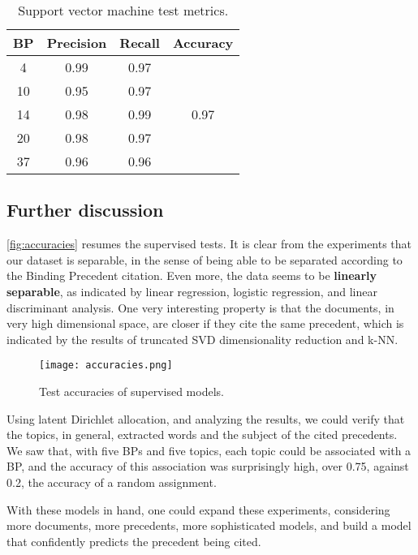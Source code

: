         \begin{table}[H]
                \centering
                \caption{Support vector machine test metrics.}
                \label{tab:svm}
                \begin{tabular}{c|cc|c}
                BP & Precision & Recall & Accuracy              \\ \hline
                4  & 0.99      & 0.97   & \multirow{5}{*}{0.97} \\
                10 & 0.95      & 0.97   &                       \\
                14 & 0.98      & 0.99   &                       \\
                20 & 0.98      & 0.97   &                       \\
                37 & 0.96      & 0.96   &                      
                \end{tabular}
        \end{table}

    \subsection{Further discussion}

        \autoref{fig:accuracies} resumes the supervised tests. It is clear from the experiments that our dataset is separable, in the sense of being able to be separated according to the Binding Precedent citation. Even more, the data seems to be \textbf{linearly separable}, as indicated by linear regression, logistic regression, and linear discriminant analysis. One very interesting property is that the documents, in very high dimensional space, are closer if they cite the same precedent, which is indicated by the results of truncated SVD dimensionality reduction and k-NN.

        \begin{figure}[H]
                \centering
                \texttt{[image: accuracies.png]}
                \caption{Test accuracies of supervised models.}
                \label{fig:accuracies}
        \end{figure}

        Using latent Dirichlet allocation, and analyzing the results, we could verify that the topics, in general, extracted words and the subject of the cited precedents. We saw that, with five BPs and five topics, each topic could be associated with a BP, and the accuracy of this association was surprisingly high, over 0.75, against 0.2, the accuracy of a random assignment.

        With these models in hand, one could expand these experiments, considering more documents, more precedents, more sophisticated models, and build a model that confidently predicts the precedent being cited.

